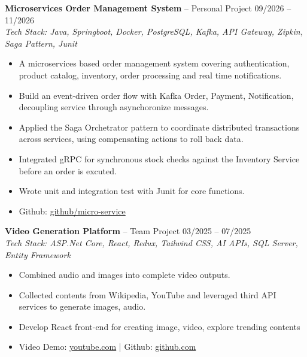 \documentclass[a4paper,10pt]{article}
\begin{document}
\vspace{0.02cm}

\noindent
\textbf{Microservices Order Management System} -- Personal Project \hfill 09/2026 -- 11/2026 \\
\textit{Tech Stack: Java, Springboot, Docker, PostgreSQL, Kafka, API Gateway, Zipkin, Saga Pattern, Junit}
\begin{itemize}
    \item A microservices based order management system covering authentication, product catalog, inventory, order processing and real time notifications.
    \item Build an event-driven order flow with Kafka Order, Payment, Notification, decoupling service through asynchoronize messages.
    \item Applied the Saga Orchetrator pattern to coordinate distributed transactions across services, using compensating actions to roll back data.
    \item Integrated gRPC for synchronous stock checks against the Inventory Service before an order is excuted.
    \item Wrote unit and integration test with Junit for core functions.
    \item Github: \href{https://github.com/Giaphuc713/BizLedger-microservice.git}{github/micro-service}
\end{itemize}
\vspace{0.02cm}

\noindent
\textbf{Video Generation Platform} -- Team Project \hfill 03/2025 -- 07/2025 \\
\textit{Tech Stack: ASP.Net Core, React, Redux, Tailwind CSS, AI APIs, SQL Server, Entity Framework}
\begin{itemize}
   \item Combined audio and images into complete video outputs.
   \item Collected contents from Wikipedia, YouTube and leveraged third API services to generate images, audio.
   \item Develop React front-end for creating image, video, explore trending contents
   \item Video Demo: \href{https://www.youtube.com/watch?v=NpTDKAR5bkM}{youtube.com} | Github: \href{https://github.com/mquangcao/gen-vibe-video}{github.com}
\end{itemize}

\vspace{0.02cm}
\end{document}
